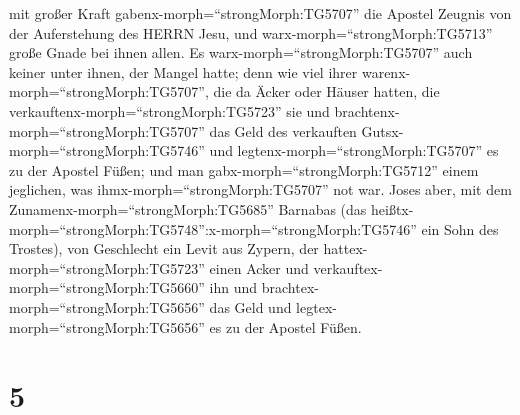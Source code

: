 mit großer Kraft gabenx-morph=``strongMorph:TG5707'' die Apostel Zeugnis
von der Auferstehung des HERRN Jesu, und
warx-morph=``strongMorph:TG5713'' große Gnade bei ihnen allen.
 Es warx-morph=``strongMorph:TG5707'' auch keiner unter
ihnen, der Mangel hatte; denn wie viel ihrer
warenx-morph=``strongMorph:TG5707'', die da Äcker oder Häuser hatten,
die verkauftenx-morph=``strongMorph:TG5723'' sie und
brachtenx-morph=``strongMorph:TG5707'' das Geld des verkauften
Gutsx-morph=``strongMorph:TG5746''  und
legtenx-morph=``strongMorph:TG5707'' es zu der Apostel Füßen; und man
gabx-morph=``strongMorph:TG5712'' einem jeglichen, was
ihmx-morph=``strongMorph:TG5707'' not war.  Joses aber, mit
dem Zunamenx-morph=``strongMorph:TG5685'' Barnabas (das
heißtx-morph=``strongMorph:TG5748'':x-morph=``strongMorph:TG5746'' ein
Sohn des Trostes), von Geschlecht ein Levit aus Zypern, 
der hattex-morph=``strongMorph:TG5723'' einen Acker und
verkauftex-morph=``strongMorph:TG5660'' ihn und
brachtex-morph=``strongMorph:TG5656'' das Geld und
legtex-morph=``strongMorph:TG5656'' es zu der Apostel Füßen.

\hypertarget{section-4}{%
\section{5}\label{section-4}}

